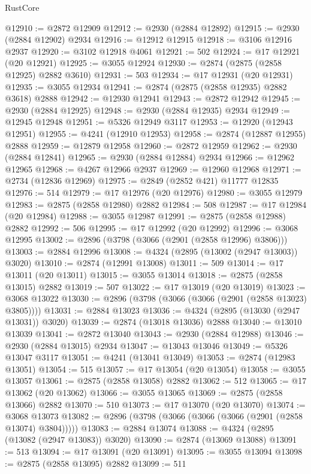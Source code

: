 \begin{lexlean}{RustCore}
\begin{coremodule}
@12910 := @2872 @12909
@12912 := @2930 (@2884 @12892)
@12915 := @2930 (@2884 @12902) @2934
@12916 := @12912 @12915
@12918 := @3106 @12916 @2937
@12920 := @3102 @12918 @4061
@12921 := 502
@12924 := @17 @12921 (@20 @12921)
@12925 := @3055 @12924
@12930 := @2874 (@2875 (@2858 @12925) @2882 @3610)
@12931 := 503
@12934 := @17 @12931 (@20 @12931)
@12935 := @3055 @12934
@12941 := @2874 (@2875 (@2858 @12935) @2882 @3618) @2888
@12942 := @12930 @12941
@12943 := @2872 @12942
@12945 := @2930 (@2884 @12925)
@12948 := @2930 (@2884 @12935) @2934
@12949 := @12945 @12948
@12951 := @5326 @12949 @3117
@12953 := @12920 (@12943 @12951)
@12955 := @4241 (@12910 @12953)
@12958 := @2874 (@12887 @12955) @2888
@12959 := @12879 @12958
@12960 := @2872 @12959
@12962 := @2930 (@2884 @12841)
@12965 := @2930 (@2884 @12884) @2934
@12966 := @12962 @12965
@12968 := @4267 @12966 @2937
@12969 := @12960 @12968
@12971 := @2734 (@12836 @12969)
@12975 := @2849 (@2852 @421) @11777 @12835
@12976 := 514
@12979 := @17 @12976 (@20 @12976)
@12980 := @3055 @12979
@12983 := @2875 (@2858 @12980) @2882
@12984 := 508
@12987 := @17 @12984 (@20 @12984)
@12988 := @3055 @12987
@12991 := @2875 (@2858 @12988) @2882
@12992 := 506
@12995 := @17 @12992 (@20 @12992)
@12996 := @3068 @12995
@13002 := @2896 (@3798 (@3066 (@2901 (@2858 @12996) @3806)))
@13003 := @2884 @12996
@13008 := @4324 (@2895 (@13002 (@2947 @13003)) @3020)
@13010 := @2874 (@12991 @13008)
@13011 := 509
@13014 := @17 @13011 (@20 @13011)
@13015 := @3055 @13014
@13018 := @2875 (@2858 @13015) @2882
@13019 := 507
@13022 := @17 @13019 (@20 @13019)
@13023 := @3068 @13022
@13030 := @2896 (@3798 (@3066 (@3066 (@2901 (@2858 @13023) @3805))))
@13031 := @2884 @13023
@13036 := @4324 (@2895 (@13030 (@2947 @13031)) @3020)
@13039 := @2874 (@13018 @13036) @2888
@13040 := @13010 @13039
@13041 := @2872 @13040
@13043 := @2930 (@2884 @12988)
@13046 := @2930 (@2884 @13015) @2934
@13047 := @13043 @13046
@13049 := @5326 @13047 @3117
@13051 := @4241 (@13041 @13049)
@13053 := @2874 (@12983 @13051)
@13054 := 515
@13057 := @17 @13054 (@20 @13054)
@13058 := @3055 @13057
@13061 := @2875 (@2858 @13058) @2882
@13062 := 512
@13065 := @17 @13062 (@20 @13062)
@13066 := @3055 @13065
@13069 := @2875 (@2858 @13066) @2882
@13070 := 510
@13073 := @17 @13070 (@20 @13070)
@13074 := @3068 @13073
@13082 := @2896 (@3798 (@3066 (@3066 (@3066 (@2901 (@2858 @13074) @3804)))))
@13083 := @2884 @13074
@13088 := @4324 (@2895 (@13082 (@2947 @13083)) @3020)
@13090 := @2874 (@13069 @13088)
@13091 := 513
@13094 := @17 @13091 (@20 @13091)
@13095 := @3055 @13094
@13098 := @2875 (@2858 @13095) @2882
@13099 := 511

\end{coremodule}
\end{lexlean}
